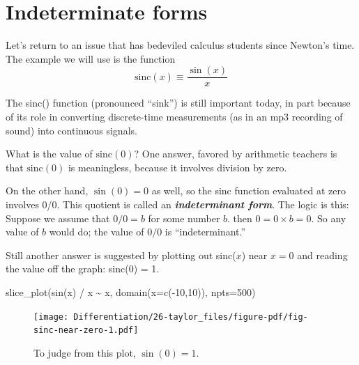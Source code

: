 \documentclass[
  letterpaper,
  DIV=11,
  numbers=noendperiod,
  oneside]{scrreprt}
\newenvironment{Shaded}{\begin{snugshade}}{\end{snugshade}}
\newcommand{\AttributeTok}[1]{\textcolor[rgb]{0.40,0.46,0.14}{#1}}
\newcommand{\DecValTok}[1]{\textcolor[rgb]{0.68,0.00,0.00}{#1}}
\newcommand{\FunctionTok}[1]{\textcolor[rgb]{0.28,0.35,0.67}{#1}}
\newcommand{\NormalTok}[1]{\textcolor[rgb]{0.00,0.46,0.62}{#1}}
\newcommand{\SpecialCharTok}[1]{\textcolor[rgb]{0.37,0.37,0.37}{#1}}
\begin{document}
\hypertarget{indeterminate-forms}{%
\section{Indeterminate forms}\label{indeterminate-forms}}

Let's return to an issue that has bedeviled calculus students since
Newton's time. The example we will use is the function
\[\text{sinc}(x)  \equiv \frac{\sin(x)}{x}\]

The sinc() function (pronounced ``sink'') is still important today, in
part because of its role in converting discrete-time measurements (as in
an mp3 recording of sound) into continuous signals.

What is the value of \(\text{sinc}(0)\)? One answer, favored by
arithmetic teachers is that \(\text{sinc}(0)\) is meaningless, because
it involves division by zero.

On the other hand, \(\sin(0) = 0\) as well, so the sinc function
evaluated at zero involves 0/0. This quotient is called an
\textbf{\emph{indeterminant form}}. The logic is this: Suppose we assume
that \(0/0 = b\) for some number \(b\). then \(0 = 0 \times b = 0\). So
any value of \(b\) would do; the value of \(0/0\) is ``indeterminant.''

Still another answer is suggested by plotting out sinc(\(x\)) near
\(x=0\) and reading the value off the graph: sinc(0) = 1.

\begin{Shaded}
\begin{Highlighting}[]
\FunctionTok{slice\_plot}\NormalTok{(}\FunctionTok{sin}\NormalTok{(x) }\SpecialCharTok{/}\NormalTok{ x }\SpecialCharTok{\textasciitilde{}}\NormalTok{ x, }\FunctionTok{domain}\NormalTok{(}\AttributeTok{x=}\FunctionTok{c}\NormalTok{(}\SpecialCharTok{{-}}\DecValTok{10}\NormalTok{,}\DecValTok{10}\NormalTok{)), }\AttributeTok{npts=}\DecValTok{500}\NormalTok{)}
\end{Highlighting}
\end{Shaded}

\begin{figure}[H]

{\centering \texttt{[image: Differentiation/26-taylor\_files/figure-pdf/fig-sinc-near-zero-1.pdf]}

}

\caption{\label{fig-sinc-near-zero}To judge from this plot,
\(\sin(0) = 1\).}

\end{figure}
\end{document}
